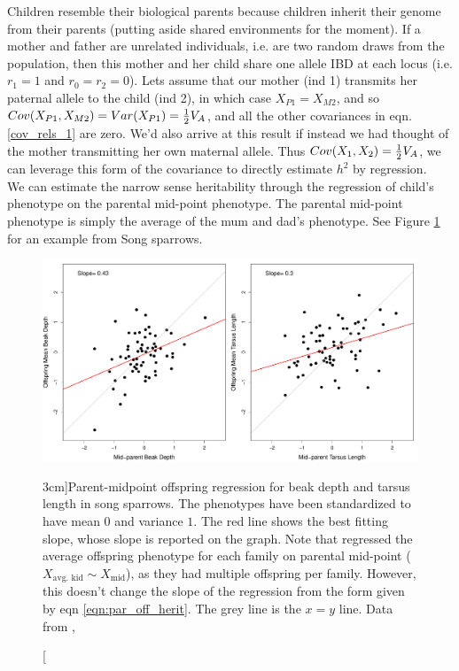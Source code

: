 Children resemble their biological parents because children inherit their genome from
their parents (putting aside shared environments for the moment). If a mother and father are unrelated individuals, i.e. are two
random draws from the population, then this mother and her child share
one allele IBD at each locus (i.e. $r_1=1$ and $r_0=r_2=0$). Lets
assume that our mother (ind 1) transmits her paternal allele to the child (ind 2), in which
case $X_{P1}=X_{M2}$, and so $Cov(X_{P1},X_{M2})=Var(X_{P1})=\tfrac{1}{2}
V_A$, and all
the other covariances in eqn. \ref{cov_rels_1} are zero. We'd also
arrive at this result if instead we had thought of the mother transmitting her own
maternal allele. Thus $Cov(X_1,X_2) = \tfrac{1}{2}
V_A$, we can leverage this form of the covariance to directly estimate
$h^2$ by regression.\\

We can estimate the narrow sense heritability through the regression of child's phenotype on the parental mid-point
phenotype. The parental mid-point phenotype is simply the average of
the mum and dad's phenotype. See Figure \ref{fig:song_sparrow_herit}
for an example from Song sparrows. 

\begin{figure}
\begin{center}
\includegraphics[width=\textwidth]{Journal_figs/Quant_gen/song_sparrow_herit/song_sparrow_herit.pdf}
\end{center}
\caption[][3cm]{Parent-midpoint offspring regression for beak depth and
  tarsus length in song sparrows.  The phenotypes have been standardized to have mean $0$  and variance $1$. The red line shows the best fitting
  slope, whose slope is reported on the graph.  Note that \citet{smith1979heritability}
regressed the average offspring phenotype
for each family on parental mid-point ($X_{\textrm{avg.~kid}}\sim X_{\textrm{mid}}$), as they had multiple offspring per family. However, this doesn't change the slope of the
regression from the form given by eqn \eqref{eqn:par_off_herit}.  The grey line is the
  $x=y$ line. Data from \citet{smith1979heritability},
  } \label{fig:song_sparrow_herit}
\end{figure}

